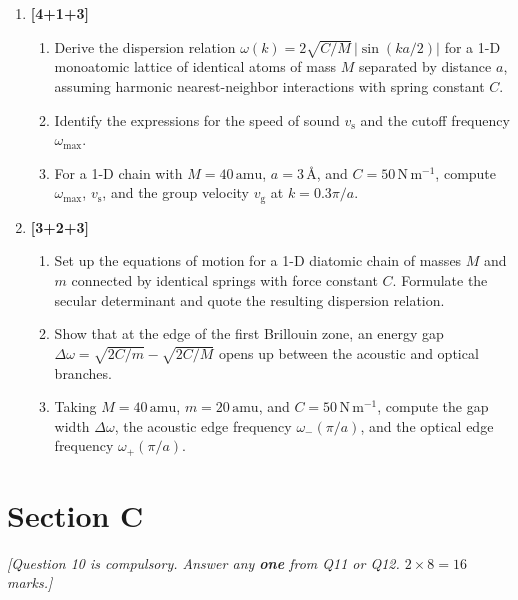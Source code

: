 \documentclass[11pt,a4paper]{article}
\begin{document}
\begin{enumerate}[leftmargin=*,itemsep=12pt,resume=questions]
\item \hfill\textbf{[4+1+3]}
\begin{enumerate}[label=(\alph*),itemsep=4pt]
    \item Derive the dispersion relation $\omega(k)=2\sqrt{C/M}\,\lvert\sin(ka/2)\rvert$ for a 1-D monoatomic lattice of identical atoms of mass $M$ separated by distance $a$, assuming harmonic nearest-neighbor interactions with spring constant $C$.
    \item Identify the expressions for the speed of sound $v_{\mathrm{s}}$ and the cutoff frequency $\omega_{\max}$.
    \item For a 1-D chain with $M=40\,\mathrm{amu}$, $a=3\,\text{\AA}$, and $C=50\,\mathrm{N\,m^{-1}}$, compute $\omega_{\max}$, $v_{\mathrm{s}}$, and the group velocity $v_{\mathrm{g}}$ at $k=0.3\pi/a$.
\end{enumerate}

\item \hfill\textbf{[3+2+3]}
\begin{enumerate}[label=(\alph*),itemsep=4pt]
    \item Set up the equations of motion for a 1-D diatomic chain of masses $M$ and $m$ connected by identical springs with force constant $C$. Formulate the secular determinant and quote the resulting dispersion relation.
    \item Show that at the edge of the first Brillouin zone, an energy gap $\Delta\omega=\sqrt{2C/m}-\sqrt{2C/M}$ opens up between the acoustic and optical branches.
    \item Taking $M=40\,\mathrm{amu}$, $m=20\,\mathrm{amu}$, and $C=50\,\mathrm{N\,m^{-1}}$, compute the gap width $\Delta\omega$, the acoustic edge frequency $\omega_{-}(\pi/a)$, and the optical edge frequency $\omega_{+}(\pi/a)$.
\end{enumerate}

\end{enumerate}

\newpage

\section*{Section C}
\noindent\textit{[Question 10 is compulsory. Answer any \textbf{one} from Q11 or Q12. $2 \times 8 = 16$ marks.]}
\vspace{4pt}
\end{document}
